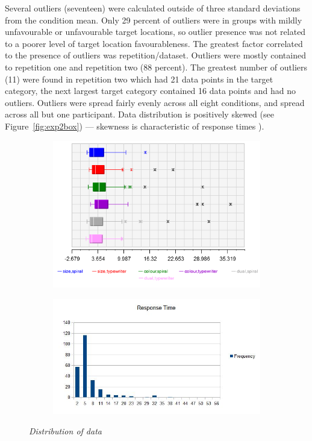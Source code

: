 Several outliers (seventeen) were calculated outside of three standard deviations from the condition mean. Only 29 percent of outliers were in groups with mildly unfavourable or unfavourable target locations, so outlier presence was not related to a poorer level of target location favourableness. The greatest factor correlated to the presence of outliers was repetition/dataset. Outliers were mostly contained to repetition one and repetition two (88 percent). The greatest number of outliers (11) were found in repetition two which had 21 data points in the target category, the next largest target category contained 16 data points and had no outliers. Outliers were spread fairly evenly across all eight conditions, and spread across all but one participant. Data distribution is positively skewed (see Figure~\vref{fig:exp2box}) --- skewness is characteristic of response times \citep[][]{luce86, zandt00, palmer11}). 

\begin{figure}[!htb]
\begin{subfigure}{\textwidth}
	\centering
	\includegraphics[scale=2.4]{boxplot.png}
\end{subfigure}
\begin{subfigure}{\textwidth}
  \centering
  \includegraphics[scale=0.50]{distribution.jpg}
\end{subfigure}
\caption{\textit{Distribution of data}}
\label{fig:exp2box}
\end{figure}

